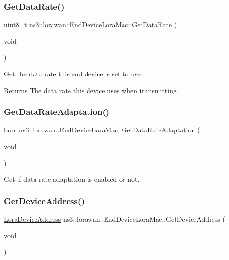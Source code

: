 \subsubsection{\texorpdfstring{Get\+Data\+Rate()}{GetDataRate()}}
{\footnotesize\ttfamily uint8\+\_\+t ns3\+::lorawan\+::\+End\+Device\+Lora\+Mac\+::\+Get\+Data\+Rate (\begin{DoxyParamCaption}\item[{void}]{ }\end{DoxyParamCaption})}

Get the data rate this end device is set to use.

\begin{DoxyReturn}{Returns}
The data rate this device uses when transmitting. 
\end{DoxyReturn}
\mbox{\label{classns3_1_1lorawan_1_1EndDeviceLoraMac_aa3b3b1eff843d141de27ad73e42d1d51}} 
\subsubsection{\texorpdfstring{Get\+Data\+Rate\+Adaptation()}{GetDataRateAdaptation()}}
{\footnotesize\ttfamily bool ns3\+::lorawan\+::\+End\+Device\+Lora\+Mac\+::\+Get\+Data\+Rate\+Adaptation (\begin{DoxyParamCaption}\item[{void}]{ }\end{DoxyParamCaption})}

Get if data rate adaptation is enabled or not. \mbox{\label{classns3_1_1lorawan_1_1EndDeviceLoraMac_a27064ed2de9f1a8eebc0f57e042f24a1}} 
\subsubsection{\texorpdfstring{Get\+Device\+Address()}{GetDeviceAddress()}}
{\footnotesize\ttfamily \hyperlink{classns3_1_1lorawan_1_1LoraDeviceAddress}{Lora\+Device\+Address} ns3\+::lorawan\+::\+End\+Device\+Lora\+Mac\+::\+Get\+Device\+Address (\begin{DoxyParamCaption}\item[{void}]{ }\end{DoxyParamCaption})}

